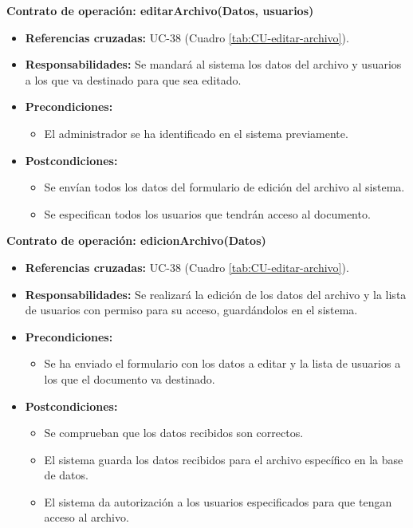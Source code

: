 \textbf{Contrato de operación: editarArchivo(Datos, usuarios)}
\begin{itemize}
\item \textbf{Referencias cruzadas:} UC-38 (Cuadro \ref{tab:CU-editar-archivo}).
\item \textbf{Responsabilidades:} Se mandará al sistema los datos del archivo y usuarios a los que va destinado para que sea editado.
\item \textbf{Precondiciones:} 
 \begin{itemize}
\item El administrador se ha identificado en el sistema previamente.
\end {itemize}
\item \textbf{Postcondiciones:} 
 \begin{itemize}
\item Se envían todos los datos del formulario de edición del archivo al sistema.
\item Se especifican todos los usuarios que tendrán acceso al documento.
\end {itemize}
\end {itemize}

\textbf{Contrato de operación: edicionArchivo(Datos)}
\begin{itemize}
\item \textbf{Referencias cruzadas:} UC-38 (Cuadro \ref{tab:CU-editar-archivo}).
\item \textbf{Responsabilidades:} Se realizará la edición de los datos del archivo y la lista de usuarios con permiso para su acceso, guardándolos en el sistema.
\item \textbf{Precondiciones:} 
 \begin{itemize}
\item Se ha enviado el formulario con los datos a editar y la lista de usuarios a los que el documento va destinado.
\end {itemize}
\item \textbf{Postcondiciones:} 
 \begin{itemize}
 \item Se comprueban que los datos recibidos son correctos.
\item El sistema guarda los datos recibidos para el archivo específico en la base de datos.
\item El sistema da autorización a los usuarios especificados para que tengan acceso al archivo.
\end {itemize}
\end {itemize}

